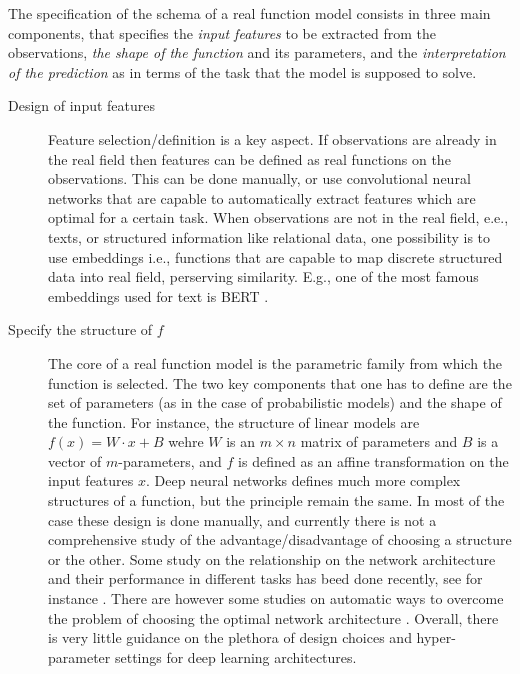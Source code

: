 The specification of the schema of a real function model consists in
three main components, that specifies the \emph{input features} to be
extracted from the observations, \emph{the shape of the function} and
its parameters, and the \emph{interpretation of the prediction} as in
terms of the task that the model is supposed to solve.
\begin{description}
\item[Design of input features]
Feature selection/definition is a key aspect. If observations are
already in the real field then features can be defined as real
functions on the observations. This can be done manually, or use
convolutional neural networks that are capable to automatically
extract features which are optimal for a certain task. When
observations are not in the real field, e.e., texts, or structured
information like relational data, one possibility is to use embeddings
i.e., functions that are capable to map discrete structured data into
real field, perserving similarity. E.g., one of the most famous
embeddings used for text is BERT \cite{devlin2018bert}.

\item[Specify the structure of $f$] The core of a real function model
  is the parametric family from which the function is selected. The
  two key components that one has to define are the set of parameters
  (as in the case of probabilistic models) and the shape of the
  function. For instance, the structure of linear models are
  $f(x) = W\cdot x + B$ wehre $W$ is an $m\times n$ matrix of
  parameters and $B$ is a vector of $m$-parameters, and $f$ is defined
  as an affine transformation on the input features $x$.  Deep neural
  networks defines much more complex structures of a function, but the
  principle remain the same. In most of the case these design is done
  manually, and currently there is not a comprehensive study of the
  advantage/disadvantage of choosing a structure or the other. Some
  study on the relationship on the network architecture and their
  performance in different tasks has beed done recently, see for
  instance \cite{lathuiliere2019comprehensive,cortes2017adanet}.
  There are however some studies on automatic ways to overcome the
  problem of choosing the optimal network architecture
  \cite{saxena2016convolutional,xie2017genetic}.  Overall, there is
  very little guidance on the plethora of design choices and
  hyper-parameter settings for deep learning architectures.


\end{description}
